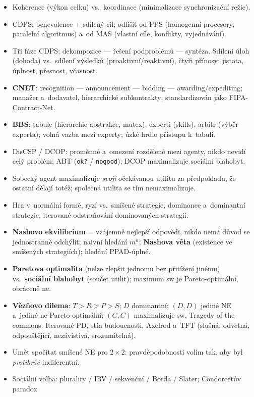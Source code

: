 \documentclass[11pt,a4paper]{article}
\theoremstyle{definition}
\begin{document}
\begin{itemize}
\item Koherence (výkon celku) vs.\ koordinace (minimalizace synchronizační režie).
\item CDPS: benevolence + sdílený cíl; odlišit od PPS (homogenní procesory, paralelní algoritmus)
  a~od MAS (vlastní cíle, konflikty, vyjednávání).
\item Tři fáze CDPS: dekompozice --- řešení podproblémů --- syntéza. Sdílení úloh (dohoda)
  vs.\ sdílení výsledků (proaktivní/reaktivní), čtyři přínosy: jistota, úplnost, přesnost,
  včasnost.
\item \textbf{CNET}: recognition --- announcement --- bidding --- awarding/expediting; manažer
  a~dodavatel, hierarchické subkontrakty; standardizován jako FIPA-Contract-Net.
\item \textbf{BBS}: tabule (hierarchie abstrakce, mutex), experti (skills), arbitr (výběr
  experta); volná vazba mezi experty; úzké hrdlo přístupu k~tabuli.
\item DisCSP / DCOP: proměnné a~omezení rozdělené mezi agenty, nikdo nevidí celý problém;
  ABT (\texttt{ok?} / \texttt{nogood}); DCOP maximalizuje sociální blahobyt.
\item Sobecký agent maximalizuje \emph{svoji} očekávanou utilitu za předpokladu, že ostatní
  dělají totéž; společná utilita se tím nemaximalizuje.
\item Hra v~normální formě, ryzí vs.\ smíšené strategie, dominance a~dominantní strategie,
  iterované odstraňování dominovaných strategií.
\item \textbf{Nashovo ekvilibrium} = vzájemně nejlepší odpovědi, nikdo nemá důvod se
  jednostranně odchýlit; naivní hledání $m^n$; \textbf{Nashova věta} (existence ve smíšených
  strategiích); hledání PPAD-úplné.
\item \textbf{Paretova optimalita} (nelze zlepšit jednomu bez přitížení jinému)
  vs.\ \textbf{sociální blahobyt} (součet utilit); maximum sw je Pareto-optimální, obráceně ne.
\item \textbf{Vězňovo dilema}: $T>R>P>S$; $D$ dominantní; $(D,D)$ jediné NE a~jediné
  ne-Pareto-optimální; $(C,C)$ maximalizuje sw. Tragedy of the commons.
  Iterované PD, stín budoucnosti, Axelrod a~TFT (slušná, odvetná, odpouštějící, nezávistivá,
  srozumitelná).
\item Umět spočítat smíšené NE pro $2\times2$: pravděpodobnosti volím tak, aby byl
  \emph{protihráč} indiferentní.
\item Sociální volba: plurality / IRV / sekvenční / Borda / Slater; Condorcetův paradox

\end{itemize}
\end{document}
